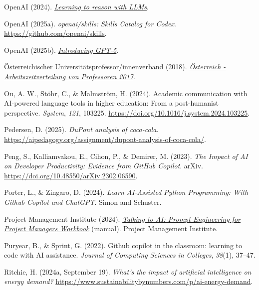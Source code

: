 \documentclass[
  ngerman,
  letterpaper,
  DIV=11]{scrreprt}
\newlength{\cslhangindent}
\newenvironment{CSLReferences}[2] %
 {\begin{list}{}{%
  \setlength{\itemindent}{0pt}
  \setlength{\leftmargin}{0pt}
  \setlength{\parsep}{0pt}
  \ifodd #1
   \setlength{\leftmargin}{\cslhangindent}
   \setlength{\itemindent}{-1\cslhangindent}
  \fi
  \setlength{\itemsep}{#2\baselineskip}}}
 {\end{list}}
\begin{document}
\begin{CSLReferences}{1}{0}
OpenAI (2024).
\emph{\href{https://openai.com/index/learning-to-reason-with-llms/}{Learning
to reason with LLMs}}.

OpenAI (2025a). \emph{openai/skills: Skills Catalog for Codex}.
\url{https://github.com/openai/skills}.

OpenAI (2025b).
\emph{\href{https://openai.com/index/introducing-gpt-5/}{Introducing
GPT-5}}.

Österreichischer Universitätsprofessor/innenverband (2018).
\emph{\href{https://de.statista.com/statistik/daten/studie/831638/umfrage/arbeitszeitverteilung-von-professoren-in-oesterreich/}{Österreich
- Arbeitszeitverteilung von Professoren 2017}}.

Ou, A. W., Stöhr, C., \& Malmström, H. (2024). Academic communication
with AI-powered language tools in higher education: From a post-humanist
perspective. \emph{System}, \emph{121}, 103225.
\url{https://doi.org/10.1016/j.system.2024.103225}.

Pedersen, D. (2025). \emph{DuPont analysis of coca-cola}.
\url{https://aipedagogy.org/assignment/dupont-analysis-of-coca-cola/}.

Peng, S., Kalliamvakou, E., Cihon, P., \& Demirer, M. (2023). \emph{The
Impact of AI on Developer Productivity: Evidence from GitHub Copilot}.
arXiv. \url{https://doi.org/10.48550/arXiv.2302.06590}.

Porter, L., \& Zingaro, D. (2024). \emph{Learn AI-Assisted Python
Programming: With Github Copilot and ChatGPT}. Simon and Schuster.

Project Management Institute (2024).
\emph{\href{https://www.pmi.org/shop/p-/elearning/talking-to-ai-prompt-engineering-for-project-managers/el128}{Talking
to AI: Prompt Engineering for Project Managers Workbook}} (manual).
Project Management Institute.

Puryear, B., \& Sprint, G. (2022). Github copilot in the classroom:
learning to code with AI assistance. \emph{Journal of Computing Sciences
in Colleges}, \emph{38}(1), 37--47.

Ritchie, H. (2024a, September 19). \emph{What's the impact of artificial
intelligence on energy demand?}
\url{https://www.sustainabilitybynumbers.com/p/ai-energy-demand}.


\end{CSLReferences}
\end{document}
